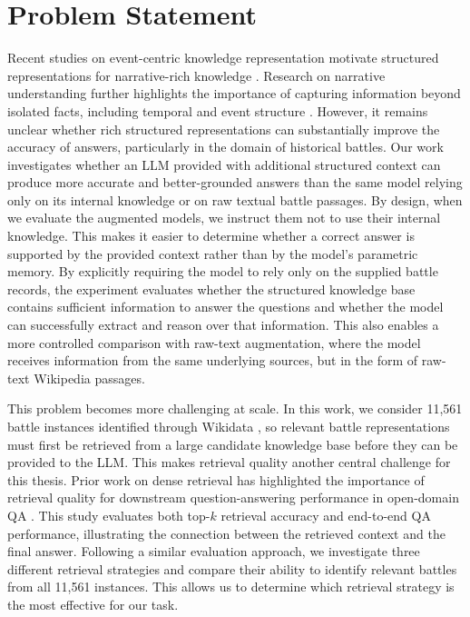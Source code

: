\section{Problem Statement}
\label{sec:problem-statement}
Recent studies on event-centric knowledge representation motivate structured representations for narrative-rich knowledge \citep{guan2023eventkg}. Research on narrative understanding further highlights the importance of capturing information beyond isolated facts, including temporal and event structure \citep{hamilton2026narrabench}. However, it remains unclear whether rich structured representations can substantially improve the accuracy of answers, particularly in the domain of historical battles. Our work investigates whether an LLM provided with additional structured context can produce more accurate and better-grounded answers than the same model relying only on its internal knowledge or on raw textual battle passages. By design, when we evaluate the augmented models, we instruct them not to use their internal knowledge. This makes it easier to determine whether a correct answer is supported by the provided context rather than by the model’s parametric memory. By explicitly requiring the model to rely only on the supplied battle records, the experiment evaluates whether the structured knowledge base contains sufficient information to answer the questions and whether the model can successfully extract and reason over that information. This also enables a more controlled comparison with raw-text augmentation, where the model receives information from the same underlying sources, but in the form of raw-text Wikipedia passages.

This problem becomes more challenging at scale. In this work, we consider 11,561 battle instances identified through Wikidata \citep{vrandecic2014wikidata}, so relevant battle representations must first be retrieved from a large candidate knowledge base before they can be provided to the LLM. This makes retrieval quality another central challenge for this thesis. Prior work on dense retrieval has highlighted the importance of retrieval quality for downstream question-answering performance in open-domain QA \citep{karpukhin2020dpr}. This study evaluates both top-$k$ retrieval accuracy and end-to-end QA performance, illustrating the connection between the retrieved context and the final answer. Following a similar evaluation approach, we investigate three different retrieval strategies and compare their ability to identify relevant battles from all 11,561 instances. This allows us to determine which retrieval strategy is the most effective for our task.

